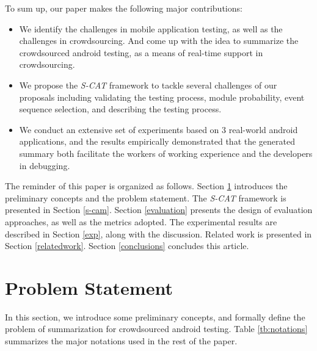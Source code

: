 \documentclass[10pt,conference]{IEEEtran}
\begin{document}
To sum up, our paper makes the following major contributions:

\begin{itemize}
\item We identify the challenges in mobile application testing, as well as the challenges in crowdsourcing. And come up with the idea
to summarize the crowdsourced android testing, as a means of real-time support in crowdsourcing. 
\item We propose the \emph{S-CAT} framework to tackle several challenges of our proposals including validating the testing process, module
probability, event sequence selection, and describing the testing process.
\item We conduct an extensive set of experiments based on $3$ real-world android applications, and the results empirically
demonstrated that the generated summary both facilitate the workers of working experience and the developers in debugging.
\end{itemize}

The reminder of this paper is organized as follows. Section \ref{problemDef} introduces the preliminary concepts and the problem statement.
The \emph{S-CAT} framework is presented in Section \ref{s-cam}. Section \ref{evaluation} presents the design of evaluation approaches,
as well as the metrics adopted. The experimental results are described in Section \ref{exp}, along with the discussion. Related work is presented in
Section \ref{relatedwork}. Section \ref{conclusions} concludes this article.


\section{Problem Statement}\label{problemDef}

In this section, we introduce some preliminary concepts, and formally define the problem of summarization for crowdsourced android
testing. Table \ref{tb:notations} summarizes the major notations used in the rest of the paper.
\end{document}
